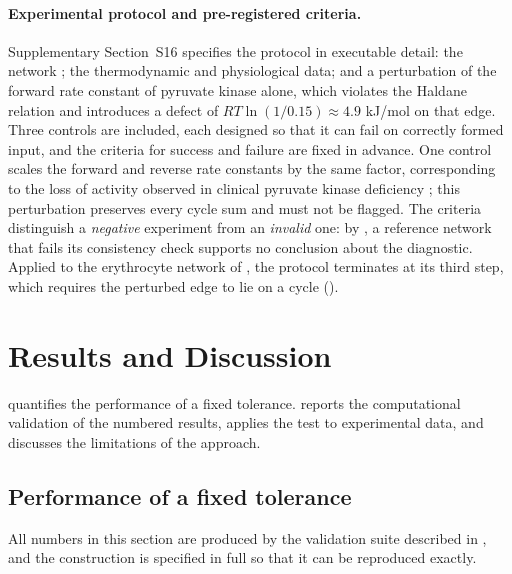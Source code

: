 \documentclass[11pt,a4paper]{article}
\theoremstyle{pstyle}
\theoremstyle{definition}
\theoremstyle{remark}
\begin{document}
\paragraph{Experimental protocol and pre-registered criteria.}
Supplementary Section~S16 specifies the protocol in executable detail:
the network \citep{brunk2018}; the thermodynamic
\citep{noor2013,flamholz2012} and physiological
\citep{rapoport1975,mulquiney1999} data; and a perturbation of the
forward rate constant of pyruvate kinase alone, which violates the
Haldane relation and introduces a defect of
$RT\ln(1/0.15)\approx4.9$ kJ/mol on that edge. Three controls are
included, each designed so that it can fail on correctly formed input,
and the criteria for success and failure are fixed in advance. One
control scales the forward and reverse rate constants by the same
factor, corresponding to the loss of activity observed in clinical
pyruvate kinase deficiency \citep{zanella2005}; this perturbation
preserves every cycle sum and must not be flagged. The criteria
distinguish a \emph{negative} experiment from an \emph{invalid} one: by
, a reference network that fails its consistency
check supports no conclusion about the diagnostic. Applied to the
erythrocyte network of , the protocol terminates at its
third step, which requires the perturbed edge to lie on a cycle
().

\section{Results and Discussion}
\label{sec:results}

 quantifies the performance of a fixed
tolerance.  reports the computational validation
of the numbered results,  applies the test to
experimental data, and  discusses the limitations of
the approach.

\subsection{Performance of a fixed tolerance}
\label{sec:fixed-tolerance-fails}

All numbers in this section are produced by the validation suite
described in , and the construction is specified in
full so that it can be reproduced exactly.
\end{document}
